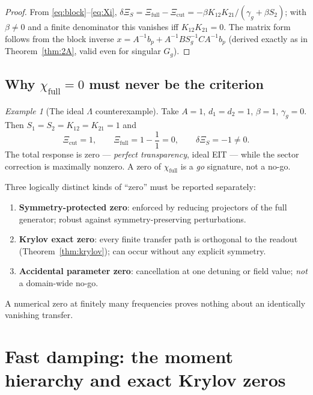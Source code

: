 \documentclass[11pt,a4paper]{article}
\theoremstyle{remark}
\newtheorem{example}[theorem]{Example}
\newcommand{\chifull}{\chi_{\mathrm{full}}}
\begin{document}
\begin{proof}
From \eqref{eq:block}--\eqref{eq:Xi},
$\delta\Xi_S=\Xi_{\mathrm{full}}-\Xi_{\mathrm{cut}}
=-\beta K_{12}K_{21}/(\gamma_g+\beta S_2)$;
with $\beta\neq0$ and a finite denominator this vanishes iff
$K_{12}K_{21}=0$. The matrix form follows from the block inverse
$x=A^{-1}b_p+A^{-1}BS_g^{-1}CA^{-1}b_p$ (derived exactly as in
Theorem~\ref{thm:2A}, valid even for singular $G_g$).
\end{proof}

\subsection{Why $\chifull=0$ must never be the criterion}

\begin{example}[The ideal $\Lambda$ counterexample]
Take $A=1$, $d_1=d_2=1$, $\beta=1$, $\gamma_g=0$. Then
$S_1=S_2=K_{12}=K_{21}=1$ and
\[
\Xi_{\mathrm{cut}}=1,\qquad
\Xi_{\mathrm{full}}=1-\frac{1}{1}=0,\qquad
\delta\Xi_S=-1\neq0 .
\]
The total response is zero --- \emph{perfect transparency}, ideal EIT --- while
the sector correction is maximally nonzero. A zero of $\chifull$ is a
\emph{go} signature, not a no-go.
\end{example}

\begin{warningbox}
Three logically distinct kinds of ``zero'' must be reported separately:
\begin{enumerate}
\item \textbf{Symmetry-protected zero}: enforced by reducing projectors of the
      full generator; robust against symmetry-preserving perturbations.
\item \textbf{Krylov exact zero}: every finite transfer path is orthogonal to
      the readout (Theorem~\ref{thm:krylov}); can occur without any explicit
      symmetry.
\item \textbf{Accidental parameter zero}: cancellation at one detuning or
      field value; \emph{not} a domain-wide no-go.
\end{enumerate}
A numerical zero at finitely many frequencies proves nothing about an
identically vanishing transfer.
\end{warningbox}

\section{Fast damping: the moment hierarchy and exact Krylov zeros}
\label{sec:moments}
\end{document}
